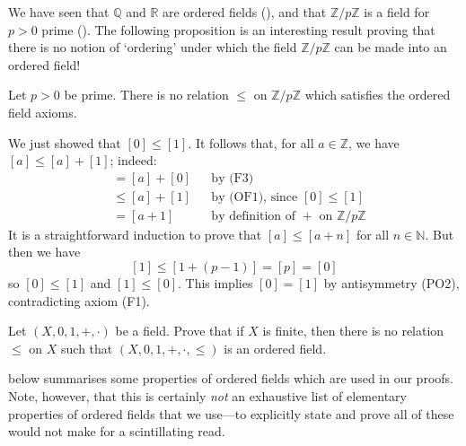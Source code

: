 We have seen that $\mathbb{Q}$ and $\mathbb{R}$ are ordered fields (), and that $\mathbb{Z}/p\mathbb{Z}$ is a field for $p>0$ prime (). The following proposition is an interesting result proving that there is no notion of `ordering' under which the field $\mathbb{Z}/p\mathbb{Z}$ can be made into an ordered field!

\begin{proposition}
Let $p>0$ be prime. There is no relation $\le$ on $\mathbb{Z}/p\mathbb{Z}$ which satisfies the ordered field axioms.
\end{proposition}
\begin{cproof}
We just showed that $[0] \le [1]$. It follows that, for all $a \in \mathbb{Z}$, we have $[a] \le [a]+[1]$; indeed:
\begin{align*}
[a] &= [a]+[0] && \text{by (F3)} \\
&\le [a]+[1] && \text{by (OF1), since $[0] \le [1]$} \\
&= [a+1] && \text{by definition of $+$ on $\mathbb{Z}/p\mathbb{Z}$}
\end{align*}
It is a straightforward induction to prove that $[a] \le [a+n]$ for all $n \in \mathbb{N}$. But then we have
\[ [1] \le [1+(p-1)] = [p] = [0] \]
so $[0] \le [1]$ and $[1] \le [0]$. This implies $[0]=[1]$ by antisymmetry (PO2), contradicting axiom (F1).
\end{cproof}

\begin{exercise}
Let $(X,0,1,+,{\cdot})$ be a field. Prove that if $X$ is finite, then there is no relation $\le$ on $X$ such that $(X,0,1,+,{\cdot},{\le})$ is an ordered field.
\end{exercise}

 below summarises some properties of ordered fields which are used in our proofs. Note, however, that this is certainly \textit{not} an exhaustive list of elementary properties of ordered fields that we use---to explicitly state and prove all of these would not make for a scintillating read.

